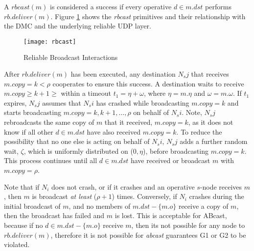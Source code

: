      A $rbcast(m)$ is considered a success if every operative $d \in m.dst$ performs $rb.deliver(m)$.  Figure \ref{fig:rbcast} shows the \emph{rbcast} primitives and their relationship with the DMC and the underlying reliable UDP layer.  
    
    \begin{figure}[!h] 
        \centering    
         \texttt{[image: rbcast]}
         \caption[Reliable Broadcast Interactions]{Reliable Broadcast Interactions}
         \label{fig:rbcast}
    \end{figure}
    
    After $rb.deliver(m)$ has been executed, any destination $N_sj$ that receives $m.copy = k < \rho$ cooperates to ensure this success.  A destination waits to receive $m.copy \geq k + 1 \geq$ within a timeout $t_1 = \eta + \omega$, where $\eta= m.\eta$ and $\omega=m.\omega$.  If $t_1$ expires, $N_sj$ assumes that $N_si$ has crashed while broadcasting $m.copy = k$ and starts broadcasting $m.copy = k, k+1,\ldots, \rho$ on behalf of $N_si$. Note, $N_sj$ rebroadcasts the same copy of $m$ that it received, $m.copy = k$, as it does not know if all other $d \in m.dst$ have also received $m.copy = k$.  To reduce the possibility that no one else is acting on behalf of $N_si$, $N_sj$ adds a further random wait, $\zeta$, which is uniformly distributed on ($0,\eta$), before broadcasting $m.copy = k$.  This process continues until all $d \in m.dst$ have received or broadcast $m$ with $m.copy = \rho$.  
    
    Note that if $N_i$ does not crash, or if it crashes and an operative $s$-node receives $m$, then $m$ is broadcast \emph{at least} ($\rho + 1$) times.  Conversely, if $N_i$ crashes during the initial broadcast of $m$, and no members of $m.dst - \{m.o\}$ receive a copy of $m$, then the broadcast has failed and $m$ is lost.  This is acceptable for \textsf{ABcast}, because if no $d \in m.dst - \{m.o\}$ receive $m$, then its not possible for any node to $rb.deliver(m)$, therefore it is not possible for \emph{abcast} guarantees G1 or G2 to be violated.  
    
    
